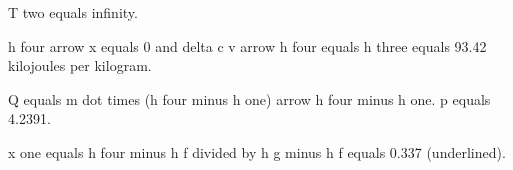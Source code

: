 T two equals infinity.  

h four arrow x equals 0 and delta c v arrow h four equals h three equals 93.42 kilojoules per kilogram.  

Q equals m dot times (h four minus h one) arrow h four minus h one.  
p equals 4.2391.  

x one equals h four minus h f divided by h g minus h f equals 0.337 (underlined).